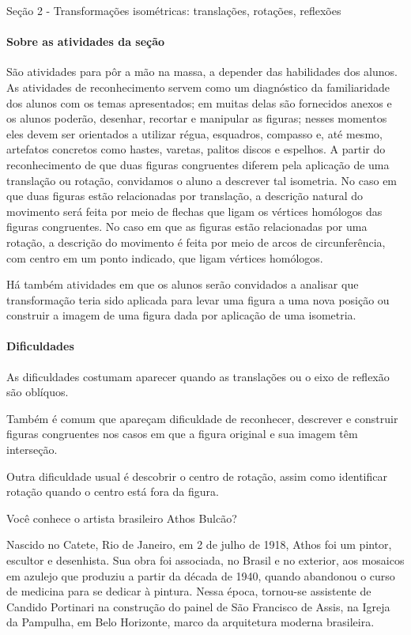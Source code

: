 \begin{paginatexto}{Seção 2 - Transformações isométricas: translações, rotações, reflexões}
\paragraph{Sobre as atividades da seção}
São atividades para pôr a mão na massa, a depender das habilidades dos alunos. As atividades de reconhecimento servem como um diagnóstico da familiaridade dos alunos com os temas apresentados; em muitas delas são fornecidos anexos e os alunos poderão, desenhar, recortar e manipular as figuras; nesses momentos eles devem ser orientados a utilizar régua, esquadros, compasso e, até mesmo, artefatos concretos como hastes, varetas, palitos discos e espelhos. A partir do reconhecimento de que duas figuras congruentes diferem pela aplicação de uma translação ou rotação, convidamos o aluno a descrever tal isometria. No caso em que duas figuras estão relacionadas por translação, a descrição natural do movimento será feita por meio de flechas que ligam os vértices homólogos das figuras congruentes. No caso em que as figuras estão relacionadas por uma rotação, a descrição do movimento é feita por meio de arcos de circunferência, com centro em um ponto indicado, que ligam vértices homólogos.  

Há também atividades em que os alunos serão convidados a analisar que transformação teria sido aplicada para levar uma figura a uma nova posição ou construir a imagem de uma figura dada por aplicação de uma isometria.

\paragraph{Dificuldades}
As dificuldades costumam aparecer quando as translações ou o eixo de reflexão são oblíquos. 

Também é comum que apareçam dificuldade de reconhecer, descrever e construir figuras congruentes nos casos em que a figura original e sua imagem têm interseção.

Outra dificuldade usual é descobrir o centro de rotação, assim como identificar rotação quando o centro está fora da figura.

\end{paginatexto}


Você conhece o artista brasileiro Athos Bulcão?

Nascido no Catete, Rio de Janeiro, em 2 de julho de 1918, Athos foi um pintor, escultor e desenhista. Sua obra foi associada, no Brasil e no exterior, aos mosaicos em azulejo que produziu a partir da década de 1940, quando abandonou o curso de medicina para se dedicar à pintura. Nessa época, tornou-se assistente de Candido Portinari na construção do painel de São Francisco de Assis, na Igreja da Pampulha, em Belo Horizonte, marco da arquitetura moderna brasileira.

